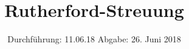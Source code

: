 

\subject{V16 }
\title{Rutherford-Streuung}
\date{
  Durchführung: 11.06.18
  \hspace{3em}
  Abgabe: 26. Juni 2018
}



\maketitle
\thispagestyle{empty}
\tableofcontents
\newpage






\printbibliography


